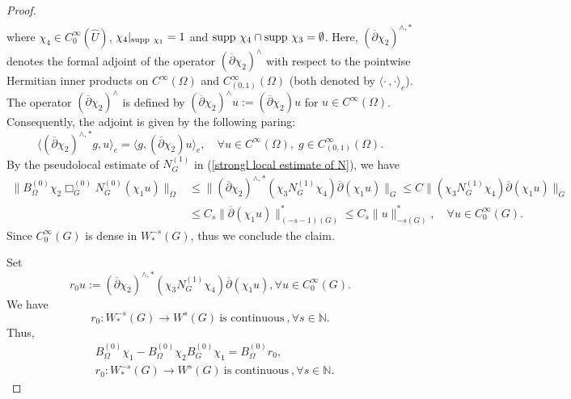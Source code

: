\documentclass[a4paper,centertags,oneside,12pt]{amsart}
\numberwithin{equation}{section}
\begin{document}
\begin{proof}
\begin{equation*}
\begin{split}
        \end{split}
    \end{equation*}
where $\chi_4\in C_0^\infty(\widehat U)$, $\chi_4|_{{\rm supp}~\chi_1}=1$ and ${\rm supp}~\chi_4\cap{\rm supp}~\chi_3=\emptyset$. Here, \( (\overline\partial\chi_2)^{\wedge, \ast} \) denotes the formal adjoint of the operator \( (\overline\partial\chi_2)^\wedge \) with respect to the pointwise Hermitian inner products on \( C^\infty(\Omega) \) and \( C^\infty_{(0, 1)}(\Omega) \) (both denoted by \( \langle\cdot\,,\cdot\rangle_e \)). The operator \( (\overline\partial\chi_2)^\wedge \) is defined by \( (\overline\partial\chi_2)^{\wedge} u := (\overline\partial\chi_2) u \) for \( u\in C^\infty(\Omega) \). Consequently, the adjoint is given by the following paring: 
\[
\langle (\overline\partial\chi_2)^{\wedge, \ast} g, u \rangle_e = \langle g, (\overline\partial\chi_2) u \rangle_e, \quad \forall u\in C^\infty(\Omega), \; g\in C^\infty_{(0, 1)}(\Omega).
\]
By the  pseudolocal estimate of $N_G^{(1)}$ in (\ref{strongl local estimate of N}), we have 
    \begin{equation*}
        \begin{split}
\|B_\Omega^{(0)}\chi_2\Box_{G}^{(0)}N_{G}^{(0)}(\chi_1 u)\|_\Omega
        &\leq \|(\overline\partial\chi_2)^{\wedge, \ast}(\chi_3 N_{G}^{(1)}\chi_4)\overline\partial(\chi_1 u)\|_G\leq C\|(\chi_3 N_G^{(1)}\chi_4)\overline\partial(\chi_1 u)\|_G\\
        &\leq C_s\|\overline\partial(\chi_1 u)\|^\ast_{(-s-1)(G)}\leq C_s\|u\|^\ast_{-s(G)}, \quad\forall u\in C_0^\infty(G).
        \end{split}
    \end{equation*}
    Since $C_0^\infty(G)$ is dense in $W_\ast^{-s}(G)$, thus we conclude  the claim.
    
    Set $$r_0u:=(\overline\partial\chi_2)^{\wedge, \ast}(\chi_3N_{G}^{(1)}\chi_4)\overline\partial(\chi_1 u), \forall u\in C_0^\infty(G).$$
     We have
    \[r_0: W_\ast^{-s}(G)\rightarrow W^s(G) ~\text{is continuous}~, \forall s\in\mathbb N.\]
   Thus, \begin{equation}\label{1-21-a6}
\begin{split}
&B_\Omega^{(0)}\chi_1-B_\Omega^{(0)}\chi_2 B_{G}^{(0)}\chi_1=B_\Omega^{(0)}r_0,\\
&r_0: W_\ast^{-s}(G)\rightarrow W^s(G) ~\text{is continuous}~, \forall s\in\mathbb N.
    \end{split}
\end{equation}


\end{proof}
\end{document}
